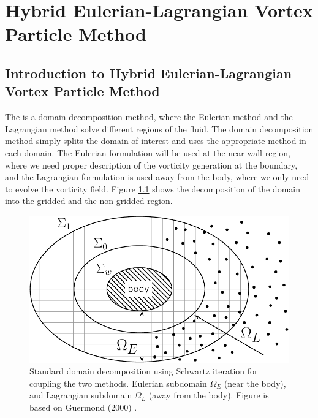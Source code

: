 \chapter{Hybrid Eulerian-Lagrangian Vortex Particle Method}
\label{ch:helvpm}


	\section{Introduction to Hybrid Eulerian-Lagrangian Vortex Particle Method}
	
	The  is a domain decomposition method, where the Eulerian method and the Lagrangian method solve different regions of the fluid. The domain decomposition method simply splits the domain of interest and uses the appropriate method in each domain. The Eulerian formulation will be used at the near-wall region, where we need proper description of the vorticity generation at the boundary, and the Lagrangian formulation is used away from the body, where we only need to evolve the vorticity field. Figure \ref{fig:domainDecomposition} shows the decomposition of the domain into the gridded and the non-gridded region.
	
		\begin{figure}[!h]
			\centering
			\includegraphics[width=0.6\linewidth]{figures/hybrid/domainDecomposition_typical_type2-crop.pdf}
			\caption{Standard domain decomposition using Schwartz iteration for coupling the two methods. Eulerian subdomain $\Omega_E$ (near the body), and Lagrangian subdomain $\Omega_L$ (away from the body). Figure is based on Guermond (2000) \cite{Guermond2000a}.}
			\label{fig:domainDecomposition}
		\end{figure}	
	
